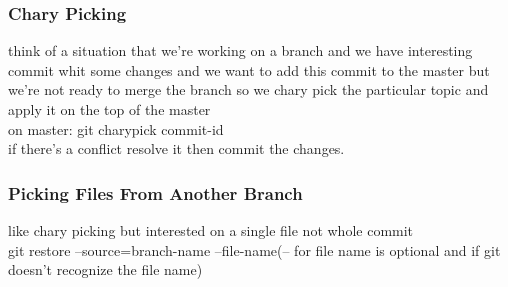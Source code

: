 \documentclass{article}
\begin{document}
		\subsubsection{Chary Picking}
			think of a situation that we're working on a branch and we have interesting commit whit some changes and we want to add this commit to the master but we're not ready to merge the branch so we chary pick the particular topic and apply it on the top of the master\\
			on master: git charypick commit-id\\
			if there's a conflict resolve it then commit the changes.
		
		\subsubsection{Picking Files From Another Branch}
			like chary picking but interested on a single file not whole commit \\
			git restore --source=branch-name --file-name(-- for file name is optional and if git doesn't recognize the file name)
\end{document}

